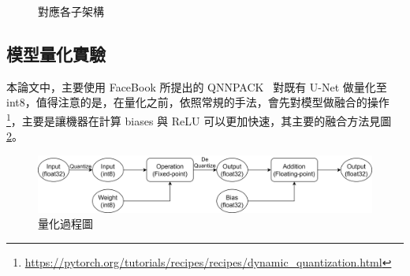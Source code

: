 \begin{figure}[htbp]
\begin{minipage}[t]{0.6\textwidth}
        \caption {對應各子架構}
        \label{MobileUnetV2_2}
    \end{minipage}
    \hfil
\end{figure}

\clearpage

\subsection{模型量化實驗}
本論文中，主要使用 FaceBook 所提出的 QNNPACK~\cite{dukhan2018qnnpack} 對既有 U-Net 做量化至 int8，值得注意的是，在量化之前，依照常規的手法，會先對模型做融合的操作\footnote{\url{https://pytorch.org/tutorials/recipes/recipes/dynamic_quantization.html}}，主要是讓機器在計算 biases 與 ReLU 可以更加快速，其主要的融合方法見圖\ref{quantization2}。

\begin{figure}[htbp]
    \hfil
    \begin{minipage}[t]{1.0\textwidth}
        \includegraphics[width=\textwidth]{./figures/chapter04_experiment/quantization2.png}
        \caption {量化過程圖}
        \label{quantization2}
    \end{minipage}
    \hfil
\end{figure}